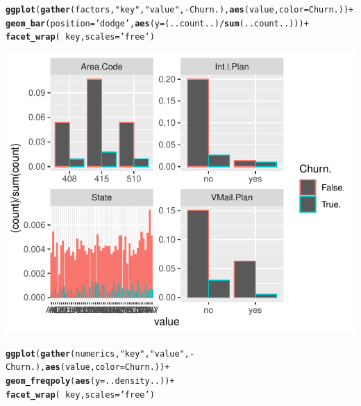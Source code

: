 \documentclass{article}\usepackage[]{graphicx}\usepackage[]{color}
\makeatletter
\def\maxwidth{ %
  \ifdim\Gin@nat@width>\linewidth
    \linewidth
  \else
    \Gin@nat@width
  \fi
}
\newcommand{\hlstr}[1]{\textcolor[rgb]{0.192,0.494,0.8}{#1}}%
\newcommand{\hlopt}[1]{\textcolor[rgb]{0,0,0}{#1}}%
\newcommand{\hlstd}[1]{\textcolor[rgb]{0.345,0.345,0.345}{#1}}%
\newcommand{\hlkwc}[1]{\textcolor[rgb]{0.333,0.667,0.333}{#1}}%
\newcommand{\hlkwd}[1]{\textcolor[rgb]{0.737,0.353,0.396}{\textbf{#1}}}%
\newenvironment{kframe}{%
 \def\at@end@of@kframe{}%
 \ifinner\ifhmode%
  \def\at@end@of@kframe{\end{minipage}}%
  \begin{minipage}{\columnwidth}%
 \fi\fi%
 \def\FrameCommand##1{\hskip\@totalleftmargin \hskip-\fboxsep
 \colorbox{shadecolor}{##1}\hskip-\fboxsep
     \hskip-\linewidth \hskip-\@totalleftmargin \hskip\columnwidth}%
 \MakeFramed {\advance\hsize-\width
   \@totalleftmargin\z@ \linewidth\hsize
   \@setminipage}}%
 {\par\unskip\endMakeFramed%
 \at@end@of@kframe}
\newenvironment{knitrout}{}{} %
\makeatother
\begin{document}
\begin{description}
\begin{knitrout}
\color{fgcolor}\begin{kframe}
\begin{alltt}
\hlkwd{ggplot}\hlstd{(}\hlkwd{gather}\hlstd{(factors,} \hlstr{"key"}\hlstd{,} \hlstr{"value"}\hlstd{,} \hlopt{-}\hlstd{Churn.),} \hlkwd{aes}\hlstd{(value,} \hlkwc{color}\hlstd{=Churn.))} \hlopt{+}
  \hlkwd{geom_bar}\hlstd{(}\hlkwc{position}\hlstd{=}\hlstr{'dodge'}\hlstd{,} \hlkwd{aes}\hlstd{(}\hlkwc{y}\hlstd{=(..count..)}\hlopt{/}\hlkwd{sum}\hlstd{(..count..)))} \hlopt{+}
  \hlkwd{facet_wrap}\hlstd{(}\hlopt{~}\hlstd{key,} \hlkwc{scales}\hlstd{=}\hlstr{'free'}\hlstd{)}
\end{alltt}
\end{kframe}

{\centering \includegraphics[width=\maxwidth]{figure/Overviews_plots_grouped-1} 

}


\begin{kframe}\begin{alltt}
\hlkwd{ggplot}\hlstd{(}\hlkwd{gather}\hlstd{(numerics,} \hlstr{"key"}\hlstd{,} \hlstr{"value"}\hlstd{,} \hlopt{-}\hlstd{Churn.),} \hlkwd{aes}\hlstd{(value,} \hlkwc{color}\hlstd{=Churn.))} \hlopt{+}
  \hlkwd{geom_freqpoly}\hlstd{(}\hlkwd{aes}\hlstd{(}\hlkwc{y}\hlstd{=..density..))} \hlopt{+}
  \hlkwd{facet_wrap}\hlstd{(}\hlopt{~}\hlstd{key,} \hlkwc{scales}\hlstd{=}\hlstr{'free'}\hlstd{)}
\end{alltt}
\end{kframe}


\end{knitrout}
\end{description}
\end{document}
